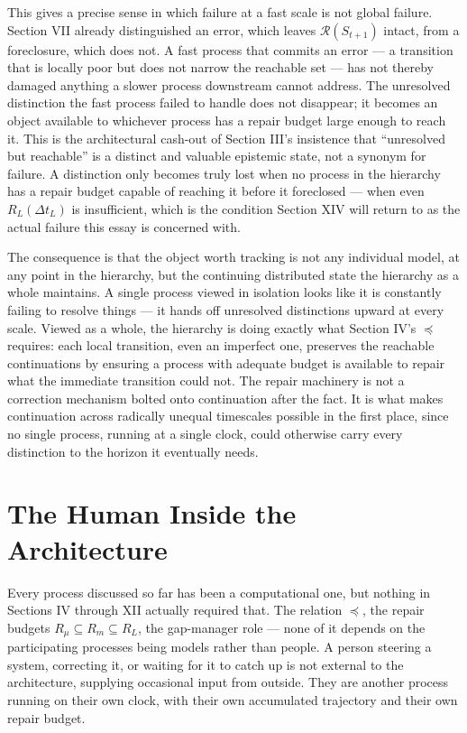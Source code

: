 \documentclass[11pt]{article}
\begin{document}
This gives a precise sense in which failure at a fast scale is not global failure. Section VII already distinguished an error, which leaves $\mathcal{R}(S_{t+1})$ intact, from a foreclosure, which does not. A fast process that commits an error --- a transition that is locally poor but does not narrow the reachable set --- has not thereby damaged anything a slower process downstream cannot address. The unresolved distinction the fast process failed to handle does not disappear; it becomes an object available to whichever process has a repair budget large enough to reach it. This is the architectural cash-out of Section III's insistence that ``unresolved but reachable'' is a distinct and valuable epistemic state, not a synonym for failure. A distinction only becomes truly lost when no process in the hierarchy has a repair budget capable of reaching it before it foreclosed --- when even $R_L(\Delta t_L)$ is insufficient, which is the condition Section XIV will return to as the actual failure this essay is concerned with.

The consequence is that the object worth tracking is not any individual model, at any point in the hierarchy, but the continuing distributed state the hierarchy as a whole maintains. A single process viewed in isolation looks like it is constantly failing to resolve things --- it hands off unresolved distinctions upward at every scale. Viewed as a whole, the hierarchy is doing exactly what Section IV's $\preceq$ requires: each local transition, even an imperfect one, preserves the reachable continuations by ensuring a process with adequate budget is available to repair what the immediate transition could not. The repair machinery is not a correction mechanism bolted onto continuation after the fact. It is what makes continuation across radically unequal timescales possible in the first place, since no single process, running at a single clock, could otherwise carry every distinction to the horizon it eventually needs.

\section{The Human Inside the Architecture}

Every process discussed so far has been a computational one, but nothing in Sections IV through XII actually required that. The relation $\preceq$, the repair budgets $R_\mu \subseteq R_m \subseteq R_L$, the gap-manager role --- none of it depends on the participating processes being models rather than people. A person steering a system, correcting it, or waiting for it to catch up is not external to the architecture, supplying occasional input from outside. They are another process running on their own clock, with their own accumulated trajectory and their own repair budget.
\end{document}
